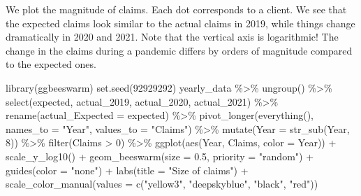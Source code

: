 \documentclass[
]{article}
\newenvironment{Shaded}{\begin{snugshade}}{\end{snugshade}}
\newcommand{\AttributeTok}[1]{\textcolor[rgb]{0.77,0.63,0.00}{#1}}
\newcommand{\DecValTok}[1]{\textcolor[rgb]{0.00,0.00,0.81}{#1}}
\newcommand{\FloatTok}[1]{\textcolor[rgb]{0.00,0.00,0.81}{#1}}
\newcommand{\FunctionTok}[1]{\textcolor[rgb]{0.00,0.00,0.00}{#1}}
\newcommand{\NormalTok}[1]{#1}
\newcommand{\SpecialCharTok}[1]{\textcolor[rgb]{0.00,0.00,0.00}{#1}}
\newcommand{\StringTok}[1]{\textcolor[rgb]{0.31,0.60,0.02}{#1}}
\begin{document}
We plot the magnitude of claims. Each dot corresponds to a client. We
see that the expected claims look similar to the actual claims in 2019,
while things change dramatically in 2020 and 2021. Note that the
vertical axis is logarithmic! The change in the claims during a pandemic
differs by orders of magnitude compared to the expected ones.

\begin{Shaded}
\begin{Highlighting}[]
\FunctionTok{library}\NormalTok{(ggbeeswarm)}
\FunctionTok{set.seed}\NormalTok{(}\DecValTok{92929292}\NormalTok{)}
\NormalTok{yearly\_data }\SpecialCharTok{\%\textgreater{}\%}
  \FunctionTok{ungroup}\NormalTok{() }\SpecialCharTok{\%\textgreater{}\%}
  \FunctionTok{select}\NormalTok{(expected, actual\_2019, actual\_2020, actual\_2021) }\SpecialCharTok{\%\textgreater{}\%}
  \FunctionTok{rename}\NormalTok{(}\AttributeTok{actual\_Expected =}\NormalTok{ expected) }\SpecialCharTok{\%\textgreater{}\%}
  \FunctionTok{pivot\_longer}\NormalTok{(}\FunctionTok{everything}\NormalTok{(), }\AttributeTok{names\_to =} \StringTok{"Year"}\NormalTok{, }\AttributeTok{values\_to =} \StringTok{"Claims"}\NormalTok{) }\SpecialCharTok{\%\textgreater{}\%}
  \FunctionTok{mutate}\NormalTok{(}\AttributeTok{Year =} \FunctionTok{str\_sub}\NormalTok{(Year, }\DecValTok{8}\NormalTok{)) }\SpecialCharTok{\%\textgreater{}\%}
  \FunctionTok{filter}\NormalTok{(Claims }\SpecialCharTok{\textgreater{}} \DecValTok{0}\NormalTok{) }\SpecialCharTok{\%\textgreater{}\%}
  \FunctionTok{ggplot}\NormalTok{(}\FunctionTok{aes}\NormalTok{(Year, Claims, }\AttributeTok{color =}\NormalTok{ Year)) }\SpecialCharTok{+} \FunctionTok{scale\_y\_log10}\NormalTok{() }\SpecialCharTok{+}
  \FunctionTok{geom\_beeswarm}\NormalTok{(}\AttributeTok{size =} \FloatTok{0.5}\NormalTok{, }\AttributeTok{priority =} \StringTok{"random"}\NormalTok{) }\SpecialCharTok{+}
  \FunctionTok{guides}\NormalTok{(}\AttributeTok{color =} \StringTok{"none"}\NormalTok{) }\SpecialCharTok{+} \FunctionTok{labs}\NormalTok{(}\AttributeTok{title =} \StringTok{"Size of claims"}\NormalTok{) }\SpecialCharTok{+}
  \FunctionTok{scale\_color\_manual}\NormalTok{(}\AttributeTok{values =} \FunctionTok{c}\NormalTok{(}\StringTok{"yellow3"}\NormalTok{, }\StringTok{"deepskyblue"}\NormalTok{, }\StringTok{"black"}\NormalTok{, }\StringTok{"red"}\NormalTok{))}
\end{Highlighting}
\end{Shaded}
\end{document}
